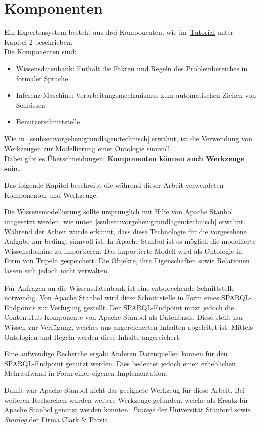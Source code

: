\chapter{Komponenten}
\label{chap:komponenten}
Ein Expertensystem besteht aus drei Komponenten, wie im~\hyperref[chap:tutorial]{Tutorial} unter Kapitel 2 beschrieben.\\
Die Komponenten sind:
\begin{itemize}
    \item Wissensdatenbank: Enthält die Fakten und Regeln des Problembereiches in formaler Sprache
    \item Inferenz-Maschine: Verarbeitungsmechanismus zum automatischen Ziehen von Schlüssen
    \item Benutzerschnittstelle
\end{itemize}
Wie in~\autoref{ssubsec:vorgehen:grundlagen:technisch} erwähnt, ist die Verwendung von Werkzeugen zur Modellierung einer Ontologie sinnvoll.\\
Dabei gibt es Überschneidungen: \textbf{Komponenten können auch Werkzeuge sein.}

Das folgende Kapitel beschreibt die während dieser Arbeit verwendeten Komponenten und Werkzeuge.

Die Wissensmodellierung sollte ursprünglich mit Hilfe von Apache Stanbol umgesetzt werden, wie unter~\autoref{ssubsec:vorgehen:grundlagen:technisch} erwähnt. Während der Arbeit wurde erkannt, dass diese Technologie für die vorgesehene Aufgabe nur bedingt sinnvoll ist. In Apache Stanbol ist es möglich die modellierte Wissensdomäne zu importieren. Das importierte Modell wird als Ontologie in Form von Tripeln gespeichert. Die Objekte, ihre Eigenschaften sowie Relationen lassen sich jedoch nicht verwalten.

Für Anfragen an die Wissensdatenbank ist eine entsprechende Schnittstelle notwendig. Von Apache Stanbol wird diese Schnittstelle in Form eines SPARQL-Endpoints zur Verfügung gestellt. Der SPARQL-Endpoint nutzt jedoch die ContentHub-Komponente von Apache Stanbol als Datenbasis. Diese stellt nur Wissen zur Verfügung, welches aus angereicherten Inhalten abgeleitet ist. Mittels Ontologien und Regeln werden diese Inhalte angereichert.

Eine aufwendige Recherche ergab: Anderen Datenquellen können für den SPARQL-Endpoint genutzt werden. Dies bedeutet jedoch einen erheblichen Mehraufwand in Form einer eigenen Implementation.

Damit war Apache Stanbol nicht das geeignete Werkzeug für diese Arbeit. Bei weiteren Recherchen wurden weitere Werkzeuge gefunden, welche als Ersatz für Apache Stanbol genutzt werden konnten: \textit{Protégé} der Universität Stanford sowie \textit{Stardog} der Firma Clark \& Parsia.

